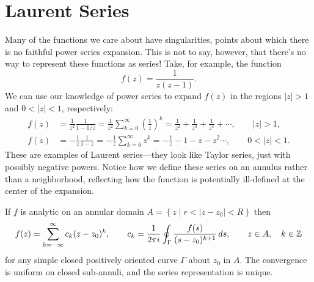 \documentclass[../m136main.tex]{subfiles}
\begin{document}
\section{Laurent Series}
Many of the functions we care about have singularities, points about which there is no faithful power series expansion.
This is not to say, however, that there's no way to represent these functions as series!
Take, for example, the function
\[ f(z) = \frac{1}{z(z-1)}. \]
We can use our knowledge of power series to expand $f(z)$ in the regions $|z| > 1$ and $0 < |z| < 1$, respectively:
\begin{align*}
    f(z) &= \frac{1}{z^2} \frac{1}{1 - 1 / z} = \frac{1}{z^2} \sum_{k=0}^{\infty} \left( \frac{1}{z} \right)^{k} = \frac{1}{z^2} + \frac{1}{z^3} + \frac{1}{z^{4}} + \cdots, \qquad |z| > 1, \\
    f(z) &= -\frac{1}{z} \frac{1}{1-z} = -\frac{1}{z} \sum_{k=0}^{\infty} z^{k} = -\frac{1}{z} - 1 - z - z^2 \cdots, \qquad 0 < |z| < 1.
\end{align*}
These are examples of Laurent series---they look like Taylor series, just with possibly negative powers.
Notice how we define these series on an annulus rather than a neighborhood, reflecting how the function is potentially ill-defined at the center of the expansion.

\begin{theorem}
    If $f$ is analytic on an annular domain $A = \left\{ z \mid r < |z - z_0| < R \right\}$ then
    \[ f(z) = \sum_{k=-\infty}^{\infty} c_k(z - z_0)^{k}, \qquad c_k = \frac{1}{2\pi i} \oint_\Gamma \frac{f(s)}{(s - z_0)^{k+1}} \,ds, \qquad z \in A, \quad k \in \mathbb{Z} \]
    for any simple closed positively oriented curve $\Gamma$ about $z_0$ in $A$.
    The convergence is uniform on closed sub-annuli, and the series representation is unique.
\end{theorem}
\end{document}
